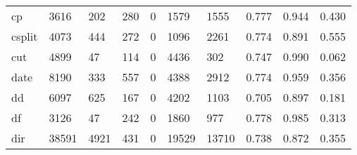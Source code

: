 \begin{longtable}{lp{1.3cm}p{1.3cm}p{1.3cm}p{1.3cm}p{1.3cm}p{1.3cm}p{1.3cm}p{1.3cm}p{1.3cm}}
cp        &                   3616 &                                202 &                               280 &                                0 &                              1579 &                            1555 &                                0.777 &                                  0.944 &                                0.430 \\
csplit    &                   4073 &                                444 &                               272 &                                0 &                              1096 &                            2261 &                                0.774 &                                  0.891 &                                0.555 \\
cut       &                   4899 &                                 47 &                               114 &                                0 &                              4436 &                             302 &                                0.747 &                                  0.990 &                                0.062 \\
date      &                   8190 &                                333 &                               557 &                                0 &                              4388 &                            2912 &                                0.774 &                                  0.959 &                                0.356 \\
dd        &                   6097 &                                625 &                               167 &                                0 &                              4202 &                            1103 &                                0.705 &                                  0.897 &                                0.181 \\
df        &                   3126 &                                 47 &                               242 &                                0 &                              1860 &                             977 &                                0.778 &                                  0.985 &                                0.313 \\
dir       &                  38591 &                               4921 &                               431 &                                0 &                             19529 &                           13710 &                                0.738 &                                  0.872 &                                0.355 \\

\end{longtable}
